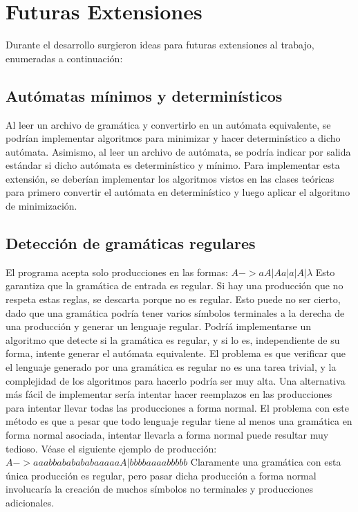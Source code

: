 \documentclass[a4paper,10pt]{article}
\begin{document}
\section{Futuras Extensiones}
    Durante el desarrollo surgieron ideas para futuras extensiones al trabajo, enumeradas a continuación:
\subsection{ Autómatas mínimos y determinísticos }
Al leer un archivo de gramática y convertirlo en un autómata equivalente, se podrían implementar algoritmos para minimizar y hacer
determinístico a dicho autómata. Asimismo, al leer un archivo de autómata, se podría indicar por salida estándar si dicho autómata es 
determinístico y mínimo. Para implementar esta extensión, se deberían implementar los algoritmos vistos en las clases teóricas para 
primero convertir el autómata en determinístico y luego aplicar el algoritmo de minimización.
\subsection{Detección de gramáticas regulares}
El programa acepta solo producciones en las formas:
$A->aA | Aa | a | A | \lambda$
Esto garantiza que la gramática de entrada es regular. Si hay una producción que no respeta estas reglas, se descarta porque no es regular. Esto 
puede no ser cierto, dado que una gramática podría tener varios símbolos terminales a la derecha de una producción y generar un lenguaje regular. 
Podríá implementarse un algoritmo que detecte si la gramática es regular, y si lo es, independiente de su forma, intente generar el autómata 
equivalente. El problema es que verificar que el lenguaje generado por una gramática es regular no es una tarea  trivial, y la complejidad de los algoritmos 
para hacerlo podría ser muy alta. Una alternativa más fácil de implementar sería intentar hacer reemplazos en las producciones para intentar llevar todas 
las producciones a forma normal. El problema con este método es que a pesar que todo lenguaje regular tiene al menos una gramática en forma normal 
asociada, intentar llevarla a forma normal puede resultar muy tedioso. Véase el siguiente ejemplo de producción:
$ A->aaabbababababaaaaaA | bbbbaaaabbbbb $
Claramente una gramática con esta única producción es regular, pero pasar dicha producción a forma normal involucaría la creación de muchos símbolos 
no terminales y producciones adicionales.
\end{document}

